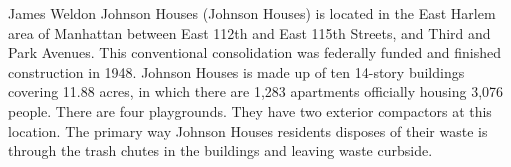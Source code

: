 James Weldon Johnson Houses (Johnson Houses) is located in the East Harlem area of Manhattan between East 112th and East  115th Streets, and Third and Park Avenues. This conventional consolidation was federally funded and finished construction in 1948. Johnson Houses is made up of ten 14-story buildings covering 11.88 acres, in which there are 1,283 apartments officially housing 3,076 people. There are four playgrounds. They have two exterior compactors at this location. The primary way Johnson Houses residents disposes of their waste is through the trash chutes in the buildings and leaving waste curbside. 